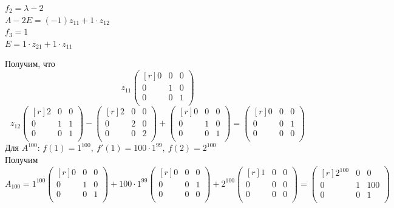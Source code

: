 \documentclass[12pt]{article}
\begin{document}
	\begin{center}
		$f_2=\lambda-2$\\
		$A-2E=(-1)z_{11}+1\cdot z_{12}$\\
		$f_3=1$\\
		$E=1\cdot z_{21}+1\cdot z_{11}$
	\end{center}
	Получим, что \[z_{11}\begin{pmatrix}[r]
	0 & 0 & 0 \\
	0 & 1 & 0 \\
	0 & 0 & 1 \\
	\end{pmatrix}\]
	\[z_{12}\begin{pmatrix}[r]
	2 & 0 & 0 \\
	0 & 1 & 1 \\
	0 & 0 & 1 \\
	\end{pmatrix} - \begin{pmatrix}[r]
	2 & 0 & 0 \\
	0 & 2 & 0 \\
	0 & 0 & 2 \\
	\end{pmatrix} + \begin{pmatrix}[r]
	0 & 0 & 0 \\
	0 & 1 & 0 \\
	0 & 0 & 1 \\
	\end{pmatrix} = \begin{pmatrix}[r]
	0 & 0 & 0 \\
	0 & 0 & 1 \\
	0 & 0 & 0 \\
	\end{pmatrix}\]
	Для $A^{100}$: $f(1)=1^{100},~f'(1)=100\cdot 1^{99},~f(2)=2^{100}$\\
	Получим
	\[A_{100}=1^{100}\begin{pmatrix}[r]
	0 & 0 & 0 \\
	0 & 1 & 0 \\
	0 & 0 & 1 \\
	\end{pmatrix} + 100\cdot 1^{99}\begin{pmatrix}[r]
	0 & 0 & 0 \\
	0 & 0 & 1 \\
	0 & 0 & 0 \\
	\end{pmatrix} + 2^{100}\begin{pmatrix}[r]
	1 & 0 & 0 \\
	0 & 0 & 0 \\
	0 & 0 & 0 \\
	\end{pmatrix} = \begin{pmatrix}[r]
	2^{100} & 0 & 0 \\
	0 & 1 & 100 \\
	0 & 0 & 1 \\
	\end{pmatrix}\]
\end{document}
